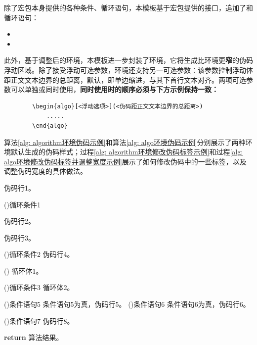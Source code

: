 \documentclass[doctor, vlined, ]{DissertUESTC}
\begin{document}
	除了\href{https://mirrors.sustech.edu.cn/CTAN/macros/latex/contrib/algorithm2e/doc/algorithm2e.pdf}{\ttfamily\color{DarkRed}}宏包本身提供的各种条件、循环语句，本模板基于宏包提供的接口，追加了和循环语句：
	\begin{itemize}
		\item {}
		\item {}
	\end{itemize}
	
	
	此外，基于调整后的环境，本模板进一步封装了环境，它将生成比环境更\textbf{\color{DarkRed}窄}的伪码浮动区域。除了接受浮动可选参数\shad{[htbp]}，环境还支持另一可选参数：该参数控制浮动体距正文文本边界的总距离，默认\shad{4em}，即单边缩进\shad{2em}，与其下首行文本对齐。两项可选参数可以单独或同时使用，\textbf{同时使用时的顺序必须与下方示例保持一致：}
	
	\begin{verbatim}
		\begin{algo}[<浮动选项>](<伪码距正文文本边界的总距离>)
		    .....
		\end{algo}
	\end{verbatim}
	
	算法\ref{alg: algorithm环境伪码示例}和算法\ref{alg: algo环境伪码示例}分别展示了两种环境默认生成的伪码样式；过程\ref{alg: algorithm环境修改伪码标签示例}和过程\ref{alg: algo环境修改伪码标签并调整宽度示例}展示了如何修改伪码中的一些标签，以及调整伪码宽度的具体做法。

	
	\begin{algorithm}[!h]
		\caption{algorithm环境伪码示例} \label{alg: algorithm环境伪码示例}
		伪码行1。
		
		\For(){循环条件1}{
			伪码行2。
			
			伪码行3。
			
			\DoWhile(){循环条件2}{
				伪码行4。
			}
			
			\Loop(){
				循环体1。
			}
			
			\Repeat(){循环条件3}{
				循环体2。
			}
			
			\uIf(){条件语句5}{
				条件语句5为真，伪码行5。
			}
			\uElseIf(){条件语句6}{
				条件语句6为真，伪码行6。
			}
			
			\If(){条件语句7}{
				伪码行8。
			}
		}
		\textbf{return} 算法结果。
	\end{algorithm}
	
\end{document}
